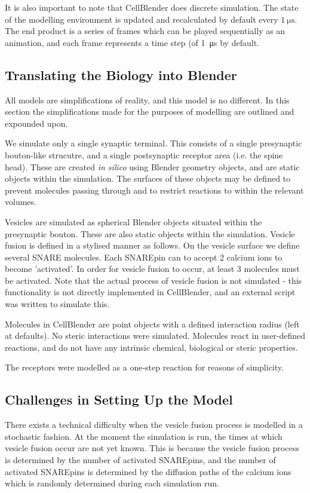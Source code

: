 \documentclass[a4paper]{article}
\begin{document}
It is also important to note that CellBlender does discrete simulation. The state of the modelling environment is updated and recalculated by default every $\SI{1}{\micro\second}$. The end product is a series of frames which can be played sequentially as an animation, and each frame represents a time step (of \SI{1}{\micro\second} by default.

\subsection{Translating the Biology into Blender}
All models are simplifications of reality, and this model is no different. In this section the simplifications made for the purposes of modelling are outlined and expounded upon.

We simulate only a single synaptic terminal. This consists of a single presynaptic bouton-like strucutre, and a single postsynaptic receptor area (i.e. the spine head). These are created \textit{in silico} using Blender geometry objects, and are static objects within the simulation. The surfaces of these objects may be defined to prevent molecules passing through and to restrict reactions to within the relevant volumes.

Vesicles are simulated as spherical Blender objects situated within the presynaptic bouton. These are also static objects within the simulation. Vesicle fusion is defined in a stylised manner as follows. On the vesicle surface we define several SNARE molecules. Each SNAREpin can to accept 2 calcium ions to become 'activated'. In order for vesicle fusion to occur, at least 3 molecules must be activated. Note that the actual process of vesicle fusion is not simulated - this functionality is not directly implemented in CellBlender, and an external script was written to simulate this.

Molecules in CellBlender are point objects with a defined interaction radius (left at defaults). No steric interactions were simulated. Molecules react in user-defined reactions, and do not have any intrinsic chemical, biological or steric properties. 

The receptors were modelled as a one-step reaction for reasons of simplicity.

\subsection{Challenges in Setting Up the Model}
There exists a technical difficulty when the vesicle fusion process is modelled in a stochastic fashion. At the moment the simulation is run, the times at which vesicle fusion occur are not yet known. This is because the vesicle fusion process is determined by the number of activated SNAREpins, and the number of activated SNAREpins is determined by the diffusion paths of the calcium ions which is randomly determined during each simulation run.
\end{document}

